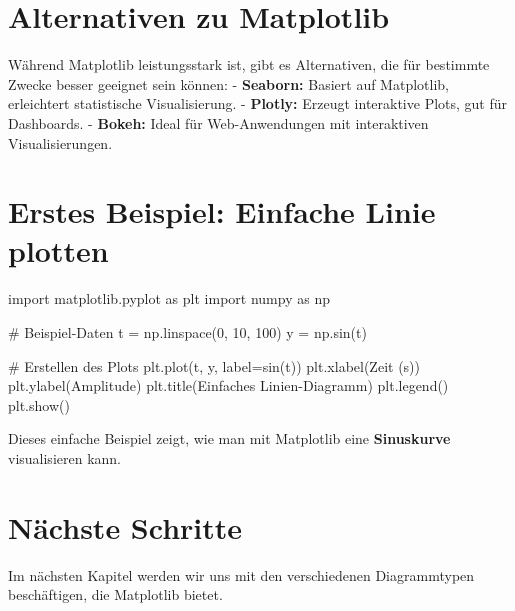 \documentclass[
  letterpaper,
  DIV=11,
  numbers=noendperiod]{scrreprt}
\newenvironment{Shaded}{\begin{snugshade}}{\end{snugshade}}
\newcommand{\CommentTok}[1]{\textcolor[rgb]{0.37,0.37,0.37}{#1}}
\newcommand{\DecValTok}[1]{\textcolor[rgb]{0.68,0.00,0.00}{#1}}
\newcommand{\ImportTok}[1]{\textcolor[rgb]{0.00,0.46,0.62}{#1}}
\newcommand{\NormalTok}[1]{\textcolor[rgb]{0.00,0.23,0.31}{#1}}
\newcommand{\OperatorTok}[1]{\textcolor[rgb]{0.37,0.37,0.37}{#1}}
\newcommand{\StringTok}[1]{\textcolor[rgb]{0.13,0.47,0.30}{#1}}
\begin{document}
\begin{tcolorbox}
\section{Alternativen zu Matplotlib}\label{alternativen-zu-matplotlib}

Während Matplotlib leistungsstark ist, gibt es Alternativen, die für
bestimmte Zwecke besser geeignet sein können: - \textbf{Seaborn:}
Basiert auf Matplotlib, erleichtert statistische Visualisierung. -
\textbf{Plotly:} Erzeugt interaktive Plots, gut für Dashboards. -
\textbf{Bokeh:} Ideal für Web-Anwendungen mit interaktiven
Visualisierungen.

\section{Erstes Beispiel: Einfache Linie
plotten}\label{erstes-beispiel-einfache-linie-plotten}

\begin{Shaded}
\begin{Highlighting}[]
\ImportTok{import}\NormalTok{ matplotlib.pyplot }\ImportTok{as}\NormalTok{ plt}
\ImportTok{import}\NormalTok{ numpy }\ImportTok{as}\NormalTok{ np}

\CommentTok{\# Beispiel{-}Daten}
\NormalTok{t }\OperatorTok{=}\NormalTok{ np.linspace(}\DecValTok{0}\NormalTok{, }\DecValTok{10}\NormalTok{, }\DecValTok{100}\NormalTok{)}
\NormalTok{y }\OperatorTok{=}\NormalTok{ np.sin(t)}

\CommentTok{\# Erstellen des Plots}
\NormalTok{plt.plot(t, y, label}\OperatorTok{=}\StringTok{\textquotesingle{}sin(t)\textquotesingle{}}\NormalTok{)}
\NormalTok{plt.xlabel(}\StringTok{\textquotesingle{}Zeit (s)\textquotesingle{}}\NormalTok{)}
\NormalTok{plt.ylabel(}\StringTok{\textquotesingle{}Amplitude\textquotesingle{}}\NormalTok{)}
\NormalTok{plt.title(}\StringTok{\textquotesingle{}Einfaches Linien{-}Diagramm\textquotesingle{}}\NormalTok{)}
\NormalTok{plt.legend()}
\NormalTok{plt.show()}
\end{Highlighting}
\end{Shaded}

Dieses einfache Beispiel zeigt, wie man mit Matplotlib eine
\textbf{Sinuskurve} visualisieren kann.

\section{Nächste Schritte}\label{nuxe4chste-schritte}

Im nächsten Kapitel werden wir uns mit den verschiedenen Diagrammtypen
beschäftigen, die Matplotlib bietet.


\end{tcolorbox}
\end{document}
